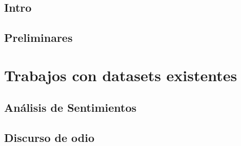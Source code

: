 \documentclass[11pt,a4paper,twoside]{tesis}
\begin{document}

\def\autor{Juan Manuel Pérez}
\def\tituloTesis{Técnicas y recursos para la detección automática de lenguaje discriminatorio en redes sociales}
\def\runtitulo{Técnicas y recursos para la detección automática de lenguaje discriminatorio en redes sociales}
\def\runtitle{Techniques and resources for the automatic detection of hate speech in social networks}
\def\director{Franco Luque}
\def\codirector{Agustín Gravano}
\def\lugar{Buenos Aires, 2021}


\frontmatter
\pagestyle{empty}


\cleardoublepage


\cleardoublepage

\cleardoublepage

\cleardoublepage
\tableofcontents

\mainmatter
\pagestyle{headings}



\chapter{Intro}


\chapter{Preliminares}

\part{Trabajos con datasets existentes}

\chapter{Análisis de Sentimientos}


\chapter{Discurso de odio}


% 
\end{document}
